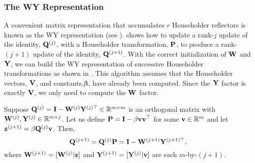 \subsubsection{The WY Representation}
A convenient matrix representation that accumulates $r$ Householder reflectors is known as the WY representation (see \cite{Bischof1987,golub2013matrix}).
 shows how to update a rank-$j$ update of the identity, $\mathbf{Q}^{(j)}$, with a Householder transformation, $\mathbf{P}$, to produce a rank-$(j+1)$ update of the identity, $\mathbf{Q}^{(j+1)}$. 
With the correct initialization of $\mathbf{W}$ and $\mathbf{Y}$, we can build the WY representation of successive Householder transformations as shown in . 
This algorithm assumes that the Householder vectors, $\mathbf{V}$, and constants,$\bm{\beta}$, have already been computed.
Since the $\mathbf{Y}$ factor is exactly $\mathbf{V}$, we only need to compute the $\mathbf{W}$ factor.
\begin{lemma}\label{lem:WY}
	Suppose $\mathbf{Q}^{(j)}=\mathbf{I}-\mathbf{W}^{(j)}\mathbf{Y}^{(j)\top}\in\mathbb{R}^{m\times m}$ is an orthogonal matrix with $\mathbf{W}^{(j)},\mathbf{Y}^{(j)}\in\mathbb{R}^{m\times j}$.
	Let us define $\mathbf{P}=\mathbf{I}-\beta\mathbf{vv}^{\top}$ for some $\mathbf{v}\in\mathbb{R}^m$ and let $\mathbf{z}^{(j+1)}=\beta\mathbf{Q}^{(j)}\mathbf{v}$.
	Then, \[\mathbf{Q}^{(j+1)} = \mathbf{Q}^{(j)}\mathbf{P} = \mathbf{I} - \mathbf{W}^{(j+1)}\mathbf{Y}^{(j+1)\top}, \]where $ \mathbf{W}^{(j+1)} =[\mathbf{W}^{(j)}|\mathbf{z}]$ and $ \mathbf{Y}^{(j+1)}=[\mathbf{Y}^{(j)}|\mathbf{v}]$ are each $m$-by-$(j+1)$. 
\end{lemma}
%

